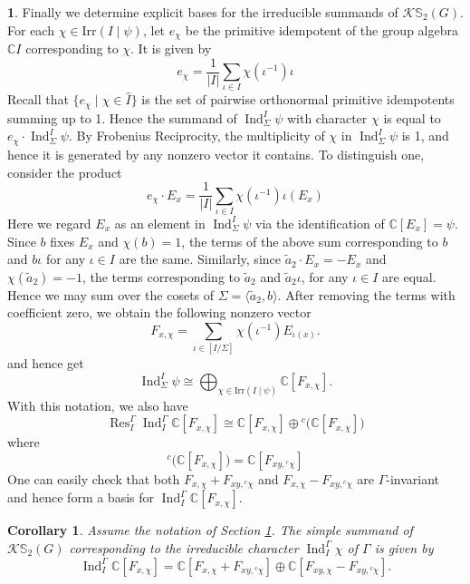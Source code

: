\documentclass[12pt]{article}
\theoremstyle{plain}
\newtheorem{corollary}[theorem]{Corollary}
\theoremstyle{definition}
\newtheorem{nothing}[theorem]{}
\newcommand{\kerlint}{\mathbb S_2}
\newcommand{\ind}{\operatorname{Ind}}
\newcommand{\res}{\operatorname{Res}}
\begin{document}
\begin{nothing}\label{sec:expbasis}
Finally we determine explicit bases for the irreducible summands of $\mathcal K\kerlint(G)$. For each $\chi\in\text{Irr}(I\mid \psi)$, let $e_\chi$ be the primitive idempotent of the group algebra $\mathbb CI$ corresponding to $\chi$. It is given by
\[
e_\chi = \frac{1}{|I|}\sum_{\iota\in I}\chi(\iota^{-1})\iota
\]
Recall that $\{ e_\chi\mid \chi\in \hat{I} \}$ is the set of pairwise orthonormal primitive idempotents summing up to 1. Hence the summand of $\ind_\Sigma^I\psi$ with character $\chi$ is equal to $e_\chi\cdot \ind_\Sigma^I\psi$. By Frobenius Reciprocity, the multiplicity of $\chi$ in $\ind_\Sigma^I\psi$ is 1, and hence it is generated by any nonzero vector it contains. To distinguish one, consider the product
\[
e_\chi\cdot E_x = \frac{1}{|I|}\sum_{\iota\in I}\chi(\iota^{-1})\iota(E_x)
\]
Here we regard $E_x$ as an element in $\ind_\Sigma^I\psi$ via the identification of $\mathbb C[E_x] = \psi$. Since $b$ fixes $E_x$ and $\chi(b) = 1$, the terms of the above sum corresponding to $b$ and $b\iota$ for any $\iota\in I$ are the same. Similarly, since $\tilde a_2\cdot E_x = -E_x$ and $\chi(\tilde a_2)= -1$, the terms corresponding to $\tilde a_2$ and $\tilde a_2\iota$, for any $\iota\in I$ are equal. Hence we may sum over the cosets of $\Sigma =\langle \tilde a_2, b\rangle$. After removing the terms with coefficient zero, we obtain the following nonzero vector
\[
F_{x, \chi} = \sum_{\iota\in [I/\Sigma]} \chi(\iota^{-1})E_{\iota(x)}.
\]
and hence get
\[
\ind_\Sigma^I \psi \cong \bigoplus_{\chi\in\text{Irr}(I\mid \psi)}\mathbb C[F_{x, \chi}].
\]
With this notation, we also have
\[
\res^\Gamma_I\ind_I^\Gamma \mathbb C[F_{x, \chi}] \cong \mathbb C[F_{x, \chi}] \oplus {}^c\big( \mathbb C[F_{x, \chi}]\big)
\]
where 
\[
{}^c\big( \mathbb C[F_{x, \chi}]\big) = \mathbb C[F_{xy, {}^c\chi}]
\]
One can easily check that both $F_{x, \chi} + F_{xy, {}^c\chi}$ and $F_{x, \chi} - F_{xy, {}^c\chi}$ are $\Gamma$-invariant and hence form a basis for $\ind_I^\Gamma \mathbb C[F_{x, \chi}]$. 
\end{nothing}
\begin{corollary}
    Assume the notation of Section \ref{sec:expbasis}. The simple summand of $\mathcal K\kerlint(G)$ corresponding to the irreducible character $\ind_I^\Gamma\chi$ of $\Gamma$ is given by 
    \[
\ind_I^\Gamma \mathbb C[F_{x, \chi}] = \mathbb C[F_{x, \chi} + F_{xy, {}^c\chi}] \oplus \mathbb C[F_{xy, \chi} - F_{xy, {}^c\chi}].
\]

\end{corollary}
\end{document}
